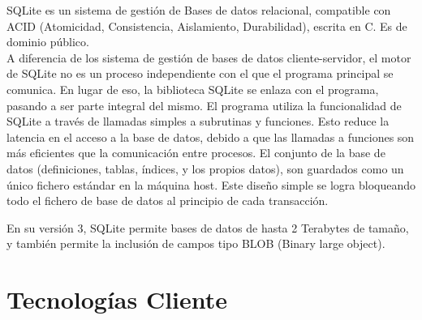 \documentclass[a4paper, 12pt]{book}
\begin{document}
SQLite es un sistema de gestión de Bases de datos relacional, compatible con ACID (Atomicidad, Consistencia, Aislamiento, Durabilidad), escrita en C. Es de dominio público. \\
A diferencia de los sistema de gestión de bases de datos cliente-servidor, el motor de SQLite no es un proceso independiente con el que el programa principal se comunica. En lugar de eso, la biblioteca SQLite se enlaza con el programa, pasando a ser parte integral del mismo. El programa utiliza la funcionalidad de SQLite a través de llamadas simples a subrutinas y funciones. Esto reduce la latencia en el acceso a la base de datos, debido a que las llamadas a funciones son más eficientes que la comunicación entre procesos. El conjunto de la base de datos (definiciones, tablas, índices, y los propios datos), son guardados como un único fichero estándar en la máquina host. Este diseño simple se logra bloqueando todo el fichero de base de datos al principio de cada transacción.

En su versión 3, SQLite permite bases de datos de hasta 2 Terabytes de tamaño, y también permite la inclusión de campos tipo BLOB (Binary large object).

\section{Tecnologías Cliente} 
\label{sec:seccion2}
\end{document}

